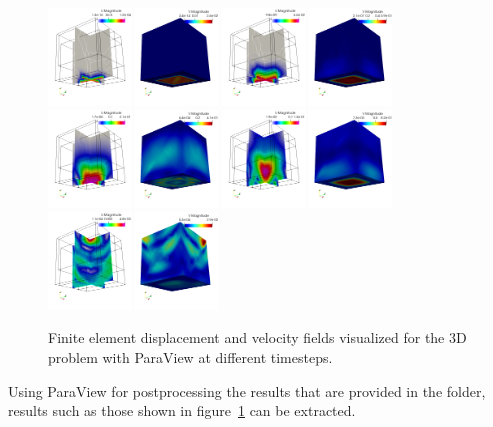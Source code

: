\begin{figure}[h!]
	\centering
	\includegraphics[width=0.4\textwidth]{./Images/sd-3du0.png}
	\includegraphics[width=0.4\textwidth]{./Images/sd-3du1.png}\\
	\includegraphics[width=0.4\textwidth]{./Images/sd-3du2.png}
	\includegraphics[width=0.4\textwidth]{./Images/sd-3du3.png}\\
	\includegraphics[width=0.4\textwidth]{./Images/sd-3du4.png}
	\caption{Finite element displacement and velocity fields visualized for the 3D problem with ParaView at different timesteps. \label{bar3d-sd}}
\end{figure}

Using ParaView for postprocessing the results that are provided in the  folder, results such as those shown in figure~\ref{bar3d-sd} can be extracted.

